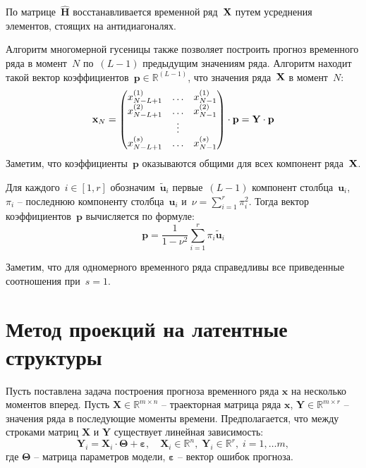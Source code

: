 \documentclass[14pt]{article}
\newcommand{\bX}{\mathbf{X}}
\newcommand{\bY}{\mathbf{Y}}
\newcommand{\bx}{\mathbf{x}}
\begin{document}
По матрице~$\hat{\mathbf{H}}$ восстанавливается временной ряд~${\bf X}$ путем усреднения элементов, стоящих на антидиагоналях. 

Алгоритм многомерной гусеницы также позволяет построить прогноз временного ряда в момент~$N$ по~$(L - 1)$ предыдущим значениям ряда. 
Алгоритм находит такой вектор коэффициентов~$\mathbf{p} \in \mathbb{R}^{(L - 1)}$, что значения ряда~${\bf X}$ в момент~$N$:
\begin{equation}
{\bf x}_N = \begin{pmatrix}
x^{(1)}_{N - L + 1} & \ldots & x^{(1)}_{N - 1} \\
x^{(2)}_{N - L + 1} & \ldots & x^{(2)}_{N - 1} \\ 
&\vdots& \\ 
x^{(s)}_{N - L + 1} & \ldots & x^{(s)}_{N - 1}
\end{pmatrix} \cdot \mathbf{p} = \mathbf{Y} \cdot \mathbf{p}
\end{equation}
Заметим, что коэффициенты~$\mathbf{p}$ оказываются общими для всех компонент ряда~${\bf X}$.


Для каждого~$i \in [1, r]$ обозначим~$\tilde{\mathbf{u}}_i$ первые~$(L - 1)$ компонент столбца~$\mathbf{u}_i$,~$\pi_i$ -- последнюю компоненту столбца~$\mathbf{u}_i$ и~$\nu = \sum_{i = 1}^{r}{\pi_i^2}$. Тогда вектор коэффициентов~$\mathbf{p}$ вычисляется по формуле:
\begin{equation}
\mathbf{p} = \frac{1}{1 - \nu^2}\sum_{i = 1}^{r}{\pi_i\tilde{\mathbf{u}}_i}
\end{equation}

Заметим, что для одномерного временного ряда справедливы все приведенные соотношения при~$s = 1$.

\newcommand{\bTheta}{\mathbf{\Theta}}
\section{Метод проекций на латентные структуры}
Пусть поставлена задача построения прогноза временного ряда $\bx$ на несколько моментов вперед.
Пусть $\bX \in \mathbb{R}^{m \times n}$ -- траекторная матрица ряда $\bx$,   $\bY \in \mathbb{R}^{m \times r}$ -- значения ряда в последующие моменты времени. Предполагается, что между строками матриц $\bX$ и $\bY$ существует линейная зависимость:
$$\bY_{i} = \bX_{i} \cdot \bTheta + \bm{\varepsilon},\quad \bX_{i} \in \mathbb{R}^{n},\; \bY_{i} \in \mathbb{R}^{r}, \; i = 1, \ldots m, $$
где $\bTheta$ -- матрица параметров модели, 	$\bm{\varepsilon}$ -- вектор ошибок прогноза. 
\end{document}
